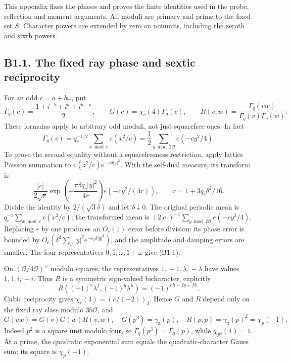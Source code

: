 \documentclass[11pt,a4paper]{article}
\begin{document}
This appendix fixes the phases and proves the finite identities used in
the probe, reflection and moment arguments. All moduli are primary and
prime to the fixed set \(S\). Character powers are extended by zero on
nonunits, including the zeroth and sixth powers.

\hypertarget{b1.1.-the-fixed-ray-phase-and-sextic-reciprocity}{%
\subsection{B1.1. The fixed ray phase and sextic
reciprocity}\label{b1.1.-the-fixed-ray-phase-and-sextic-reciprocity}}

For an odd \(c=a+b\omega\), put \[
\Gamma_q(c)=\frac{1+i^{-b}+i^a+i^{b-a}}2,
\qquad G(c)=\overline{\chi_c(4)}\Gamma_q(c),
\qquad R(v,w)=\frac{\Gamma_q(vw)}{\Gamma_q(v)\Gamma_q(w)}.
\tag{B1.1}
\] These formulas apply to arbitrary odd moduli, not just squarefree
ones. In fact \[
\Gamma_q(c)=q_c^{-1/2}\sum_{x\bmod c}e(x^2/c)
=\frac12\sum_{y\bmod2\mathcal O}e(-cy^2/4).
\tag{B1.2}
\] To prove the second equality without a squarefreeness restriction,
apply lattice Poisson summation to \(e(z^2/c)e^{-\pi\delta|z|^2}\). With
the self-dual measure, its transform is \[
\frac{|c|}{2\sqrt r}\exp\!\left(-\frac{\pi\delta q_c|y|^2}{4r}\right)e(-cy^2/(4r)),
\qquad r=1+3q_c\delta^2/16.
\] Divide the identity by \(2/(\sqrt3\delta)\) and let
\(\delta\downarrow0\). The original periodic mean is
\(q_c^{-1}\sum_{x\bmod c}e(x^2/c)\); the transformed mean is
\((2|c|)^{-1}\sum_{y\bmod2\mathcal O}e(-cy^2/4)\). Replacing \(r\) by
one produces an \(O_c(1)\) error before division: its phase error is
bounded by \(O_c(\delta^2\sum_y|y|^2e^{-c_1\delta|y|^2})\), and the
amplitude and damping errors are smaller. The four representatives
\(0,\allowbreak{}1,\allowbreak{}\omega,\allowbreak{}1+\omega\) give (B1.1).

On \((\mathcal O/4\mathcal O)^\times\) modulo squares, the
representatives \(1,\allowbreak{}-1,\allowbreak{}\lambda,\allowbreak{}-\lambda\) have values \(1,\allowbreak{}1,\allowbreak{}i,\allowbreak{}-i\). Thus
\(R\) is a symmetric sign-valued bicharacter, explicitly \[
R((-1)^e\lambda^f,(-1)^g\lambda^h)=(-1)^{eh+fg+fh}.
\tag{B1.3}
\] Cubic reciprocity gives \(\chi_c(4)=(c/(-2))_3\). Hence \(G\) and
\(R\) depend only on the fixed ray class modulo \(36\mathcal O\), and \[
G(vw)=G(v)G(w)R(v,w),\quad
G(p^3)=\gamma_3(p),\quad R(p,p)=\gamma_3(p)^2=\chi_p(-1).
\tag{B1.4}
\] Indeed \(p^2\) is a square unit modulo four, so
\(\Gamma_q(p^3)=\Gamma_q(p)\), while \(\chi_{p^3}(4)=1\). At a prime,
the quadratic exponential sum equals the quadratic-character Gauss sum;
its square is \(\chi_p(-1)\).
\end{document}

